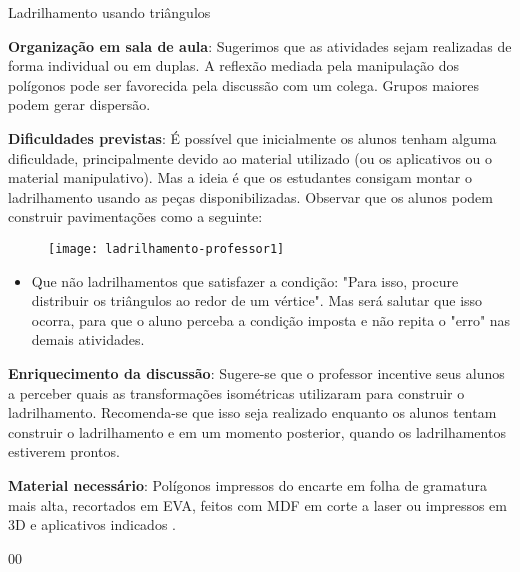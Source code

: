 \begin{sugestions}{Ladrilhamento usando triângulos}
{
\textbf{Organização em sala de aula}: Sugerimos que as atividades sejam realizadas de forma individual ou em duplas. A reflexão mediada pela manipulação dos polígonos pode ser favorecida pela discussão com um colega. Grupos maiores podem gerar dispersão.

\textbf{Dificuldades previstas}: É possível que inicialmente os alunos tenham alguma dificuldade, principalmente devido ao material utilizado (ou os aplicativos ou o material manipulativo). Mas a ideia é que os estudantes consigam montar o ladrilhamento usando as peças disponibilizadas.  Observar que os alunos podem construir pavimentações como a seguinte:

\begin{figure}[H]
\centering

\texttt{[image: ladrilhamento-professor1]}
\end{figure}

\begin{itemize}
\item Que não ladrilhamentos que satisfazer a condição: "Para isso, procure distribuir os triângulos ao redor de um vértice". Mas será salutar que isso ocorra, para que o aluno perceba a condição imposta e não repita o "erro" nas demais atividades.
\end{itemize}

\textbf{Enriquecimento da discussão}: Sugere-se que o professor incentive seus alunos a perceber quais as transformações isométricas utilizaram para construir o ladrilhamento. Recomenda-se que isso seja realizado enquanto os alunos tentam construir o ladrilhamento e em um momento posterior, quando os ladrilhamentos estiverem prontos.

\textbf{Material necessário}: Polígonos impressos do encarte em folha de gramatura mais alta, recortados em EVA, feitos com MDF em corte a laser ou impressos em 3D e aplicativos indicados .

}{0}{0}
\end{sugestions}
